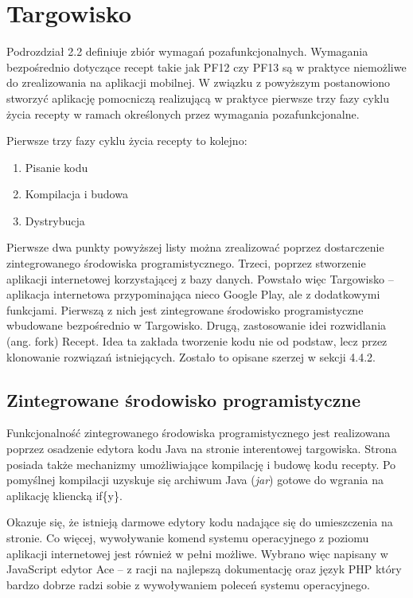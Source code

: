 \documentclass[11pt,a4paper,polish,thesis]{dcsbook}
\begin{document}
\section{Targowisko}
Podrozdział 2.2 definiuje zbiór wymagań pozafunkcjonalnych. Wymagania bezpośrednio dotyczące recept takie jak PF12 czy PF13 są w praktyce niemożliwe do zrealizowania
na aplikacji mobilnej. W związku z powyższym postanowiono stworzyć aplikację pomocniczą realizującą w praktyce pierwsze trzy fazy cyklu życia recepty w
ramach określonych przez wymagania pozafunkcjonalne.

Pierwsze trzy fazy cyklu życia recepty to kolejno:
\begin{enumerate}
\item Pisanie kodu
\item Kompilacja i budowa
\item Dystrybucja
\end{enumerate}

Pierwsze dwa punkty powyższej listy można zrealizować poprzez dostarczenie zintegrowanego środowiska programistycznego. Trzeci, poprzez stworzenie aplikacji
internetowej korzystającej z bazy danych. Powstało więc Targowisko -- aplikacja internetowa przypominająca nieco Google Play, ale z dodatkowymi funkcjami.
Pierwszą z nich jest zintegrowane środowisko programistyczne wbudowane bezpośrednio w Targowisko. Drugą, zastosowanie idei rozwidlania (ang. fork) Recept. Idea ta
zakłada tworzenie kodu nie od podstaw, lecz przez klonowanie rozwiązań istniejących. Zostało to opisane szerzej w sekcji 4.4.2. %

\subsection{Zintegrowane środowisko programistyczne}
Funkcjonalność zintegrowanego środowiska programistycznego jest realizowana poprzez osadzenie edytora kodu Java na stronie interentowej targowiska. Strona posiada
także mechanizmy umożliwiające kompilację i budowę kodu recepty. Po pomyślnej kompilacji uzyskuje się archiwum Java (\emph{jar}) gotowe do wgrania na aplikację
kliencką if\{y\}.

Okazuje się, że istnieją darmowe edytory kodu nadające się do umieszczenia na stronie. Co więcej, wywoływanie komend systemu operacyjnego z poziomu aplikacji
internetowej jest również w pełni możliwe. Wybrano więc napisany w JavaScript edytor Ace -- z racji na najlepszą dokumentację oraz język PHP który bardzo dobrze
radzi sobie z wywoływaniem poleceń systemu operacyjnego.
\end{document}

